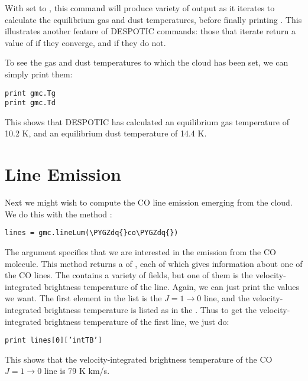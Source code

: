 \documentclass[letterpaper,10pt,english]{sphinxmanual}
\def\PYGZdq{\char`\"}
\begin{document}
With  set to , this command will produce variety of
output as it iterates to calculate the equilibrium gas and dust
temperatures, before finally printing . This illustrates
another feature of DESPOTIC commands: those that iterate return a
value of  if they converge, and  if they do not.

To see the gas and dust temperatures to which the cloud has been set,
we can simply print them:

\begin{Verbatim}[commandchars=\\\{\}]
print gmc.Tg
print gmc.Td
\end{Verbatim}

This shows that DESPOTIC has calculated an equilibrium gas temperature
of 10.2 K, and an equilibrium dust temperature of 14.4 K.


\section{Line Emission}
\label{quickstart:line-emission}
Next we might wish to compute the CO line emission emerging from the
cloud. We do this with the  method :

\begin{Verbatim}[commandchars=\\\{\}]
lines = gmc.lineLum(\PYGZdq{}co\PYGZdq{})
\end{Verbatim}

The argument  specifies that we are interested in the emission
from the CO molecule. This method returns a  of , each
of which gives information about one of the CO lines. The 
contains a variety of fields, but one of them is the
velocity-integrated brightness temperature of the line. Again, we can
just print the values we want. The first element in the list is the
\(J = 1 \rightarrow 0\) line, and the velocity-integrated
brightness temperature is listed as  in the . Thus to
get the velocity-integrated brightness temperature of the first line,
we just do:

\begin{Verbatim}[commandchars=\\\{\}]
print lines[0][’intTB’]
\end{Verbatim}

This shows that the velocity-integrated brightness temperature of the
CO \(J = 1 \rightarrow 0\) line is 79 K km/s.
\end{document}
